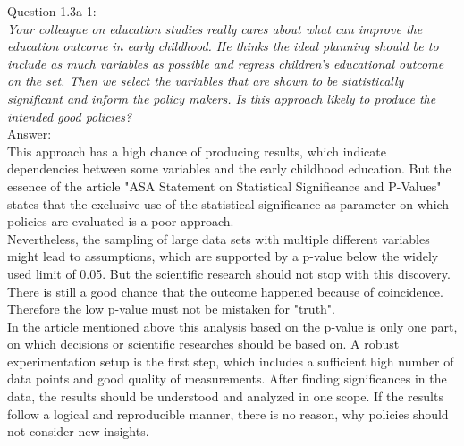 
Question 1.3a-1:\\	
\textsl{Your colleague on education studies really cares about what can improve the education outcome in early childhood. He thinks the ideal planning should be to include as much variables as possible and regress children's educational outcome on the set. Then we select the variables that are shown to be statistically significant and inform the policy makers. Is this approach likely to produce the intended good policies?}\\

Answer:\\
This approach has a high chance of producing results, which indicate dependencies between some variables and the early childhood education. But the essence of the article "ASA Statement on Statistical Significance and P-Values" states that the exclusive use of the statistical significance as parameter on which policies are evaluated is a poor approach.\\

Nevertheless, the sampling of large data sets with multiple different variables might lead to assumptions, which are supported by a p-value below the widely used limit of 0.05. But the scientific research should not stop with this discovery. There is still a good chance that the outcome happened because of coincidence. Therefore the low p-value must not be mistaken for "truth".\\

In the article mentioned above this analysis based on the p-value is only one part, on which decisions or scientific researches should be based on. A robust experimentation setup is the first step, which includes a sufficient high number of data points and good quality of measurements. After finding significances in the data, the results should be understood and analyzed in one scope. If the results follow a logical and reproducible manner, there is no reason, why policies should not consider new insights.\\
